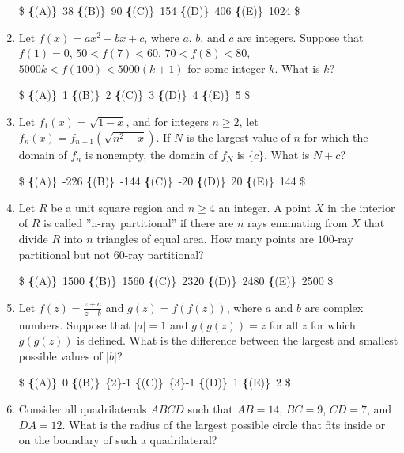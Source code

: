 \documentclass{article}
\begin{document}
\begin{enumerate}[label=\arabic*., itemsep=0.5em]
\$
\textbf\{(A)\}\ 38 \qquad
\textbf\{(B)\}\ 90 \qquad
\textbf\{(C)\}\ 154 \qquad
\textbf\{(D)\}\ 406 \qquad
\textbf\{(E)\}\ 1024 \$\par \vspace{0.5em}\item Let $f(x)=ax^2+bx+c$, where $a$, $b$, and $c$ are integers. Suppose that $f(1)=0$, $50<f(7)<60$, $70<f(8)<80$, $5000k<f(100)<5000(k+1)$ for some integer $k$. What is $k$?

\$
\textbf\{(A)\}\ 1 \qquad
\textbf\{(B)\}\ 2 \qquad
\textbf\{(C)\}\ 3 \qquad
\textbf\{(D)\}\ 4 \qquad
\textbf\{(E)\}\ 5 \$\par \vspace{0.5em}\item Let $f_{1}(x)=\sqrt{1-x}$, and for integers $n \geq 2$, let $f_{n}(x)=f_{n-1}(\sqrt{n^2 - x})$. If $N$ is the largest value of $n$ for which the domain of $f_{n}$ is nonempty, the domain of $f_{N}$ is $\{ c\}$. What is $N+c$?

\$
\textbf\{(A)\}\ -226 \qquad
\textbf\{(B)\}\ -144 \qquad
\textbf\{(C)\}\ -20 \qquad
\textbf\{(D)\}\ 20 \qquad
\textbf\{(E)\}\ 144 \$\par \vspace{0.5em}\item Let $R$ be a unit square region and $n \geq 4$ an integer. A point $X$ in the interior of $R$ is called ''n-ray partitional'' if there are $n$ rays emanating from $X$ that divide $R$ into $n$ triangles of equal area. How many points are $100$-ray partitional but not $60$-ray partitional?

\$
\textbf\{(A)\}\ 1500 \qquad
\textbf\{(B)\}\ 1560 \qquad
\textbf\{(C)\}\ 2320 \qquad
\textbf\{(D)\}\ 2480 \qquad
\textbf\{(E)\}\ 2500 \$\par \vspace{0.5em}\item Let $f(z)= \frac{z+a}{z+b}$ and $g(z)=f(f(z))$, where $a$ and $b$ are complex numbers. Suppose that $\left| a \right| = 1$ and $g(g(z))=z$ for all $z$ for which $g(g(z))$ is defined. What is the difference between the largest and smallest possible values of $\left| b \right|$?

\$
\textbf\{(A)\}\ 0 \qquad
\textbf\{(B)\}\ \sqrt\{2\}-1 \qquad
\textbf\{(C)\}\ \sqrt\{3\}-1 \qquad
\textbf\{(D)\}\ 1 \qquad
\textbf\{(E)\}\ 2 \$\par \vspace{0.5em}\item Consider all quadrilaterals $ABCD$ such that $AB=14$, $BC=9$, $CD=7$, and $DA=12$. What is the radius of the largest possible circle that fits inside or on the boundary of such a quadrilateral?


\end{enumerate}
\end{document}
